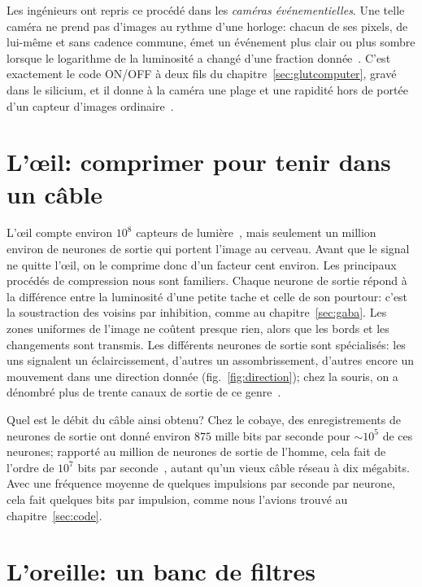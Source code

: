 Les ingénieurs ont repris ce procédé dans les \emph{caméras événementielles}. Une telle caméra ne prend pas d'images au rythme d'une horloge: chacun de ses pixels, de lui-même et sans cadence commune, émet un événement \og plus clair\fg{} ou \og plus sombre\fg{} lorsque le logarithme de la luminosité a changé d'une fraction donnée~\cite{Lichtsteiner2008}. C'est exactement le code ON/OFF à deux fils du chapitre~\ref{sec:glutcomputer}, gravé dans le silicium, et il donne à la caméra une plage et une rapidité hors de portée d'un capteur d'images ordinaire~\cite{Gallego2022}.

\section{L'œil: comprimer pour tenir dans un câble}

L'œil compte environ $10^8$ capteurs de lumière~\cite{Curcio1990}, mais seulement un million environ de neurones de sortie qui portent l'image au cerveau. Avant que le signal ne quitte l'œil, on le comprime donc d'un facteur cent environ. Les principaux procédés de compression nous sont familiers. Chaque neurone de sortie répond à la différence entre la luminosité d'une petite tache et celle de son pourtour: c'est la soustraction des voisins par inhibition, comme au chapitre~\ref{sec:gaba}. Les zones uniformes de l'image ne coûtent presque rien, alors que les bords et les changements sont transmis. Les différents neurones de sortie sont spécialisés: les uns signalent un éclaircissement, d'autres un assombrissement, d'autres encore un mouvement dans une direction donnée (fig.~\ref{fig:direction}); chez la souris, on a dénombré plus de trente canaux de sortie de ce genre~\cite{Baden2016}.

Quel est le débit du câble ainsi obtenu? Chez le cobaye, des enregistrements de neurones de sortie ont donné environ $875$ mille bits par seconde pour $\sim10^5$ de ces neurones; rapporté au million de neurones de sortie de l'homme, cela fait de l'ordre de $10^7$ bits par seconde~\cite{Koch2006}, autant qu'un vieux câble réseau à dix mégabits. Avec une fréquence moyenne de quelques impulsions par seconde par neurone, cela fait quelques bits par impulsion, comme nous l'avions trouvé au chapitre~\ref{sec:code}.

\section{L'oreille: un banc de filtres}

